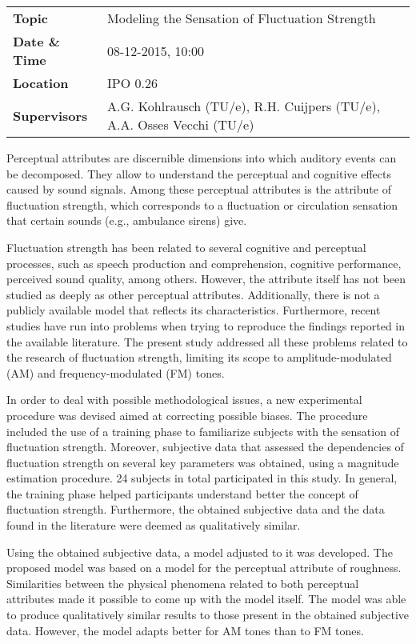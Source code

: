 \documentclass{scrartcl}
\begin{document}
\noindent\begin{tabu} to 
  \textbf{Topic}        & Modeling the Sensation of Fluctuation Strength \\
  \textbf{Date \& Time} & 08-12-2015, 10:00 \\
  \textbf{Location}     & IPO 0.26 \\
  \textbf{Supervisors}  & A.G. Kohlrausch (TU/e), R.H. Cuijpers (TU/e),
                          A.A. Osses Vecchi (TU/e) \\
\end{tabu}

\vspace{0.5cm}

Perceptual attributes are discernible dimensions into which auditory events can
be decomposed. They allow to understand the perceptual and cognitive effects
caused by sound signals. Among these perceptual attributes is the attribute of
fluctuation strength, which corresponds to a fluctuation or circulation
sensation that certain sounds (e.g., ambulance sirens) give.

Fluctuation strength has been related to several cognitive and perceptual
processes, such as speech production and comprehension, cognitive performance,
perceived sound quality, among others. However, the attribute itself has not
been studied as deeply as other perceptual attributes. Additionally, there is
not a publicly available model that reflects its characteristics. Furthermore,
recent studies have run into problems when trying to reproduce the findings
reported in the available literature. The present study addressed all these
problems related to the research of fluctuation strength, limiting its scope
to amplitude-modulated (AM) and frequency-modulated (FM) tones.

In order to deal with possible methodological issues, a new experimental
procedure was devised aimed at correcting possible biases. The procedure
included the use of a training phase to familiarize subjects with the sensation
of fluctuation strength. Moreover, subjective data that assessed the
dependencies of fluctuation strength on several key parameters was obtained,
using a magnitude estimation procedure. 24 subjects in total participated in
this study. In general, the training phase helped participants understand better
the concept of fluctuation strength. Furthermore, the obtained subjective data
and the data found in the literature were deemed as qualitatively similar.

Using the obtained subjective data, a model adjusted to it was developed. The
proposed model was based on a model for the perceptual attribute of
roughness. Similarities between the physical phenomena related to both
perceptual attributes made it possible to come up with the model itself.
The model was able to produce qualitatively similar results to those present
in the obtained subjective data. However, the model adapts better for AM tones
than to FM tones.
\end{document}
